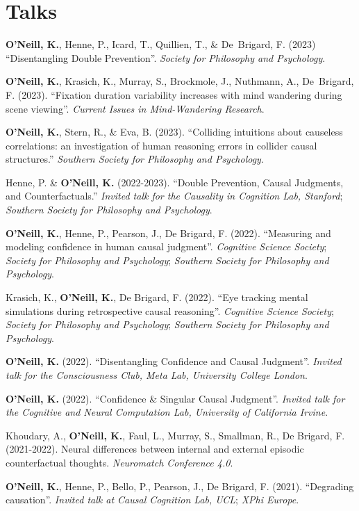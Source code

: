 \section{Talks}
\textbf{O'Neill, K.}, Henne, P., Icard, T., Quillien, T., \&
De~Brigard, F. (2023) ``Disentangling Double
Prevention''. \emph{Society for Philosophy and Psychology}.

\textbf{O'Neill, K.}, Krasich, K., Murray, S., Brockmole, J.,
Nuthmann, A., De~Brigard, F. (2023). ``Fixation duration variability
increases with mind wandering during scene viewing''. \emph{Current
Issues in Mind-Wandering Research}.

\textbf{O'Neill, K.}, Stern, R., \& Eva, B. (2023). ``Colliding
intuitions about causeless correlations: an investigation of human
reasoning errors in collider causal structures.'' \emph{Southern
Society for Philosophy and Psychology}.

Henne, P. \& \textbf{O'Neill, K.} (2022-2023). ``Double Prevention,
Causal Judgments, and Counterfactuals.'' \emph{Invited talk for the
Causality in Cognition Lab, Stanford}; \emph{Southern Society for
Philosophy and Psychology}.

\textbf{O'Neill, K.}, Henne, P., Pearson, J., De Brigard,
F. (2022). ``Measuring and modeling confidence in human causal
judgment''. \emph{Cognitive Science Society}; \emph{Society for
Philosophy and Psychology}; \emph{Southern Society for Philosophy and
Psychology}.

Krasich, K., \textbf{O'Neill, K.}, De Brigard, F. (2022). ``Eye
tracking mental simulations during retrospective causal
reasoning''. \emph{Cognitive Science Society}; \emph{Society for
Philosophy and Psychology}; \emph{Southern Society for Philosophy and
Psychology}.

\textbf{O'Neill, K.} (2022). ``Disentangling Confidence and Causal
Judgment''. \emph{Invited talk for the Consciousness Club, Meta Lab,
University College London}.

\textbf{O'Neill, K.} (2022). ``Confidence \& Singular Causal
Judgment''. \emph{Invited talk for the Cognitive and Neural
Computation Lab, University of California Irvine}.

Khoudary, A., \textbf{O’Neill, K.}, Faul, L., Murray, S., Smallman,
R., De Brigard, F. (2021-2022). Neural differences between internal
and external episodic counterfactual thoughts. \emph{Neuromatch
Conference 4.0}.

\textbf{O'Neill, K.}, Henne, P., Bello, P., Pearson, J., De Brigard,
F. (2021). ``Degrading causation''. \emph{Invited talk at Causal
Cognition Lab, UCL}; \emph{XPhi Europe}.

